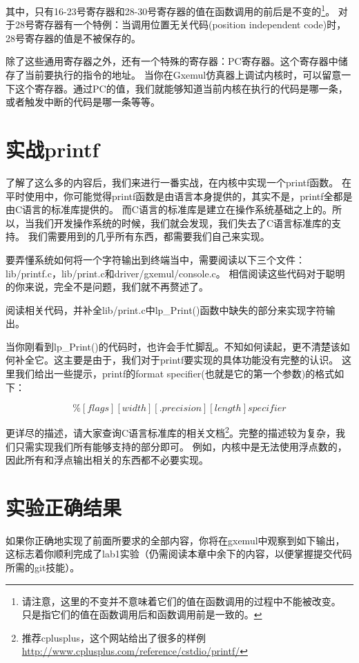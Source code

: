 其中，只有16-23号寄存器和28-30号寄存器的值在函数调用的前后是不变的\footnote{请注意，这里的不变并不意味着它们的值在函数调用的过程中不能被改变。
只是指它们的值在函数调用后和函数调用前是一致的。}。
对于28号寄存器有一个特例：当调用位置无关代码(position independent code)时，28号寄存器的值是不被保存的。

除了这些通用寄存器之外，还有一个特殊的寄存器：PC寄存器。这个寄存器中储存了当前要执行的指令的地址。
当你在Gxemul仿真器上调试内核时，可以留意一下这个寄存器。通过PC的值，我们就能够知道当前内核在执行的代码是哪一条，
或者触发中断的代码是哪一条等等。

\section{实战printf}
了解了这么多的内容后，我们来进行一番实战，在内核中实现一个printf函数。
在平时使用中，你可能觉得printf函数是由语言本身提供的，其实不是，printf全都是由C语言的标准库提供的。
而C语言的标准库是建立在操作系统基础之上的。所以，当我们开发操作系统的时候，我们就会发现，我们失去了C语言标准库的支持。
我们需要用到的几乎所有东西，都需要我们自己来实现。

要弄懂系统如何将一个字符输出到终端当中，需要阅读以下三个文件：lib/printf.c，lib/print.c和driver/gxemul/console.c。
相信阅读这些代码对于聪明的你来说，完全不是问题，我们就不再赘述了。

\begin{exercise}
阅读相关代码，并补全lib/print.c中lp\_Print()函数中缺失的部分来实现字符输出。
\end{exercise}

当你刚看到lp\_Print()的代码时，也许会手忙脚乱。不知如何读起，更不清楚该如何补全它。这主要是由于，我们对于printf要实现的具体功能没有完整的认识。
这里我们给出一些提示，printf的format specifier(也就是它的第一个参数)的格式如下：

\begin{equation*}
  \%[flags][width][.precision][length]specifier 
\end{equation*}

更详尽的描述，请大家查询C语言标准库的相关文档\footnote{推荐cplusplus，这个网站给出了很多的样例
\url{http://www.cplusplus.com/reference/cstdio/printf/}}。完整的描述较为复杂，我们只需实现我们所有能够支持的部分即可。
例如，内核中是无法使用浮点数的，因此所有和浮点输出相关的东西都不必要实现。

\section{实验正确结果}
如果你正确地实现了前面所要求的全部内容，你将在gxemul中观察到如下输出，这标志着你顺利完成了lab1实验（仍需阅读本章中余下的内容，以便掌握提交代码所需的git技能）。

